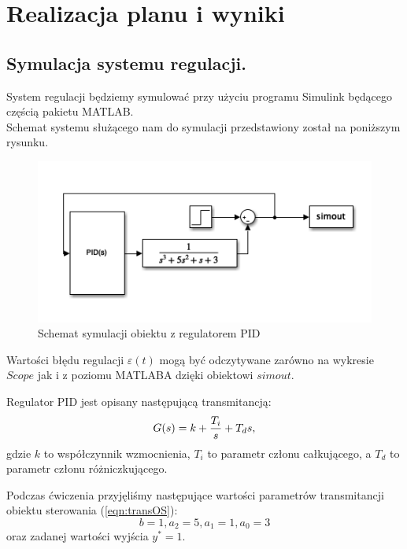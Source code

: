 \documentclass[a4paper,10pt]{article}
\begin{document}
\newpage
\section{Realizacja planu i wyniki}

%
%
\subsection{Symulacja systemu regulacji.}\label{sec:zad1}
System regulacji będziemy symulować przy użyciu programu Simulink będącego częścią pakietu M\small ATLAB. \\
\normalsize Schemat systemu służącego nam do symulacji przedstawiony został na poniższym rysunku.

\begin{figure}[!h]
    \centering
	\includegraphics[width=120mm]{schemat.png}
	\caption{Schemat symulacji obiektu z regulatorem PID}
    \label{fig:Rysunek}
\end{figure}

Wartości błędu regulacji $\varepsilon(t)$ mogą być odczytywane zarówno na wykresie $Scope$ jak i z poziomu M\small ATLABA \normalsize dzięki obiektowi $simout$.

Regulator PID jest opisany następującą transmitancją:
\begin{equation} \label{eqn:transPID}
	G(s) = k + {T_{i} \over s} + T_{d}s ,
\end{equation}
gdzie $k$ to współczynnik wzmocnienia, $T_{i}$ to parametr członu całkującego, a $T_{d}$ to parametr członu różniczkującego.

Podczas ćwiczenia przyjęliśmy następujące wartości parametrów transmitancji obiektu sterowania (\ref{eqn:transOS}): 
\begin{equation} \label{eqn:paramTransOS}
	b = 1,
	a_{2} = 5, 
	a_{1} = 1, 
	a_{0} = 3
\end{equation}
oraz zadanej wartości wyjścia $y^{*} = 1$.
\end{document}
